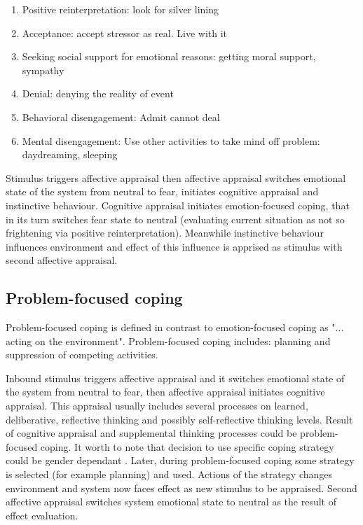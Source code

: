 \begin{enumerate}
	\item  Positive reinterpretation: look for silver lining
	\item  Acceptance: accept stressor as real. Live with it
	\item  Seeking  social  support  for  emotional  reasons: getting moral support, sympathy
	\item  Denial: denying the reality of event
	\item  Behavioral disengagement: Admit cannot deal
	\item  Mental  disengagement:  Use  other  activities  to take mind off problem: daydreaming, sleeping
\end{enumerate}



Stimulus triggers affective appraisal then affective appraisal switches emotional state of the system from neutral to fear, initiates cognitive appraisal and instinctive behaviour. Cognitive appraisal initiates emotion-focused coping, that in its turn switches fear state to neutral (evaluating current situation as not so frightening via positive reinterpretation). Meanwhile instinctive behaviour influences environment and effect of this influence is apprised as stimulus with second affective appraisal.

\subsection{Problem-focused coping}

Problem-focused coping is defined in contrast to emotion-focused coping as "... acting on the environment". Problem-focused coping includes: planning and suppression of competing activities.



Inbound stimulus triggers affective appraisal and it switches emotional state of the system from neutral to fear, then affective appraisal initiates cognitive appraisal. This appraisal usually includes several processes on learned, deliberative, reflective thinking and possibly self-reflective thinking levels. Result of cognitive appraisal and supplemental thinking processes could be problem-focused coping. It worth to note that decision to use specific coping strategy could be gender dependant \cite{sex_differencies}. Later, during problem-focused coping some strategy is selected (for example planning) and used. Actions of the strategy changes environment and system now faces effect as new stimulus to be appraised. Second affective appraisal switches system emotional state to neutral as the result of effect evaluation.

